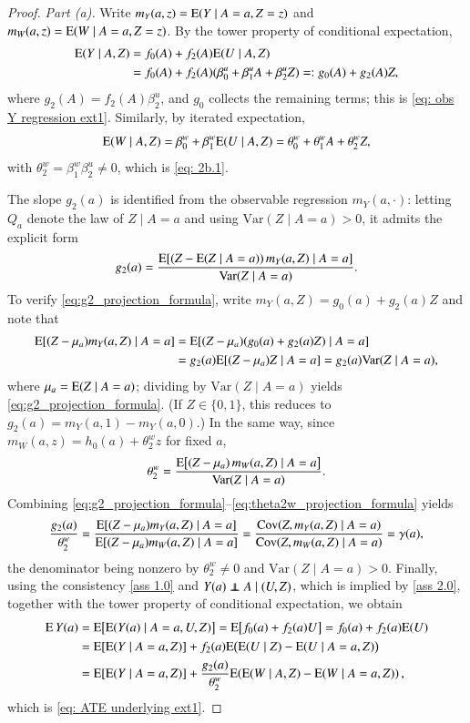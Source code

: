 \begin{proof}
\emph{Part (a).} Write $m_Y(a,z)=\mathrm{E}(Y\mid A=a,Z=z)$ and $m_W(a,z)=\mathrm{E}(W\mid A=a,Z=z)$. By the tower property of conditional expectation,
\begin{align*}
\mathrm{E}(Y\mid A,Z)
&=f_0(A)+f_2(A)\mathrm{E}(U\mid A,Z) \\
&=f_0(A)+f_2(A)(\beta_0^u+\beta_1^uA+\beta_2^uZ) =: g_0(A)+g_2(A)Z,
\end{align*}
where $g_2(A)=f_2(A)\beta_2^u$, and $g_0$ collects the remaining terms; this is \eqref{eq: obs Y regression ext1}. Similarly, by iterated expectation,
\[
\mathrm{E}(W\mid A,Z)=\beta_0^w+\beta_1^w\mathrm{E}(U\mid A,Z)=\theta_0^w+\theta_1^wA+\theta_2^w Z,
\]
with $\theta_2^w=\beta_1^w\beta_2^u\neq 0$, which is \eqref{eq: 2b.1}.

The slope $g_2(a)$ is identified from the observable regression $m_Y(a,\cdot)$: letting $Q_a$ denote the law of $Z\mid A=a$ and using $\mathrm{Var}(Z\mid A=a)>0$, it admits the explicit form
\begin{align}
g_2(a)
=
\frac{\mathrm{E}\!\left[(Z-\mathrm{E}(Z\mid A=a))\,m_Y(a,Z)\mid A=a\right]}
{\mathrm{Var}(Z\mid A=a)}.
\label{eq:g2_projection_formula}
\end{align}
To verify \eqref{eq:g2_projection_formula}, write $m_Y(a,Z)=g_0(a)+g_2(a)Z$ and note that
\begin{align*}
\mathrm{E}[(Z-\mu_a)m_Y(a,Z)\mid A=a]
&=\mathrm{E}[(Z-\mu_a)(g_0(a)+g_2(a)Z)\mid A=a] \\
&=g_2(a)\mathrm{E}[(Z-\mu_a)Z\mid A=a]
=g_2(a)\mathrm{Var}(Z\mid A=a),
\end{align*}
where $\mu_a=\mathrm{E}(Z\mid A=a)$; dividing by $\mathrm{Var}(Z\mid A=a)$ yields \eqref{eq:g2_projection_formula}.
(If $Z\in\{0,1\}$, this reduces to $g_2(a)=m_Y(a,1)-m_Y(a,0)$.)
In the same way, since $m_W(a,z)=h_0(a)+\theta_2^w z$ for fixed $a$,
\begin{align}
\theta_2^w
=
\frac{\mathrm{E}\!\left[(Z-\mu_a)\,m_W(a,Z)\mid A=a\right]}
{\mathrm{Var}(Z\mid A=a)}.
\label{eq:theta2w_projection_formula}
\end{align}
Combining \eqref{eq:g2_projection_formula}--\eqref{eq:theta2w_projection_formula} yields
\[
\frac{g_2(a)}{\theta_2^w}
=
\frac{\mathrm{E}[(Z-\mu_a)m_Y(a,Z)\mid A=a]}{\mathrm{E}[(Z-\mu_a)m_W(a,Z)\mid A=a]}
=
\frac{\mathrm{Cov}\!\left(Z, m_Y(a,Z)\mid A=a\right)}{\mathrm{Cov}\!\left(Z, m_W(a,Z)\mid A=a\right)}
= \gamma(a),
\]
the denominator being nonzero by $\theta_2^w\neq 0$ and $\mathrm{Var}(Z\mid A=a)>0$.
Finally, using the consistency \ref{ass 1.0} and $Y(a)\independent A\mid(U,Z)$, which is implied by \ref{ass 2.0}, together with the tower property of conditional expectation, we obtain
\begin{align*}
    \mathrm{E} \, Y(a) &= \mathrm{E} \big[ \mathrm{E} (Y(a)\mid A=a,U,Z)\big] = \mathrm{E} \big[f_0(a) + f_2(a)U\big] = f_0(a) + f_2(a)\mathrm{E} (U) \\ &= \mathrm{E} [ \mathrm{E} (Y\mid A=a,Z)] + f_2(a)\mathrm{E} \big( \mathrm{E} (U\mid Z) - \mathrm{E} (U \mid A=a,Z)\big) \\ &= \mathrm{E} [ \mathrm{E} (Y\mid A=a,Z)] + \frac{g_2(a)}{\theta_2^w} \mathrm{E} \!\left( \mathrm{E} (W \mid A,Z) - \mathrm{E} ( W \mid A=a,Z) \right),
\end{align*}
which is \eqref{eq: ATE underlying ext1}.


\end{proof}
